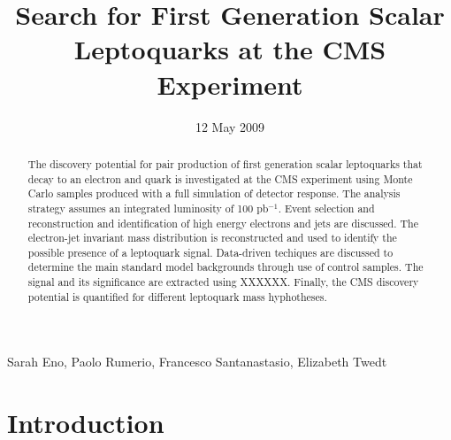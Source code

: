 
%

\begin{titlepage}

   \date{12 May 2009}


  \title{Search for First Generation Scalar Leptoquarks at the CMS Experiment}

  \begin{Authlist}
   Sarah Eno, Paolo Rumerio, Francesco Santanastasio, Elizabeth Twedt
  \end{Authlist}


  \begin{abstract}
    The discovery potential for pair production of first generation scalar leptoquarks that 
    decay to an electron and quark is investigated 
    at the CMS experiment using Monte Carlo samples produced with a full simulation of detector response.  
    The analysis strategy assumes an integrated luminosity of 100 pb$^{-1}$.
    Event selection and reconstruction and identification of high energy electrons and jets are discussed.
    The electron-jet invariant mass distribution is reconstructed
    and used to identify the possible presence of a leptoquark signal.
    Data-driven techiques are discussed to determine the main standard model backgrounds through use of 
    control samples. The signal and its significance are extracted using XXXXXX.
    Finally, the CMS discovery potential is quantified for different leptoquark mass hyphotheses.

  \end{abstract} 

\end{titlepage}

\setcounter{page}{2}%

\section{Introduction}


